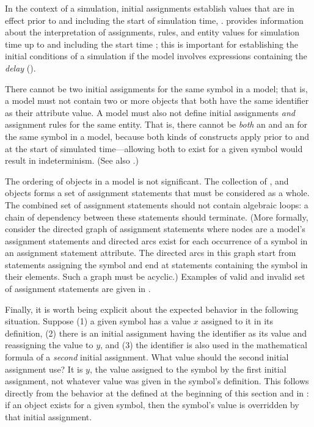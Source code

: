 In the context of a simulation, initial assignments establish
values that are in effect prior to and including the start of
simulation time, \ie {}.  
provides information about the interpretation of assignments,
rules, and entity values for simulation time up to and including
the start time ; this is important for establishing the
initial conditions of a simulation if the model involves
expressions containing the \emph{delay} 
().

There cannot be two initial assignments for the same symbol in a
model; that is, a model must not contain two or more
\InitialAssignment objects that both have the same identifier as
their  attribute value.  A model must also not define
initial assignments \emph{and} assignment rules for the same
entity.  That is, there cannot be \emph{both} an
\InitialAssignment and an \AssignmentRule for the same symbol in a
model, because both kinds of constructs apply prior to and at the
start of simulated time---allowing both to exist for a given
symbol would result in indeterminism.  (See also
.)

The ordering of \InitialAssignment objects in a model is not
significant.  The collection of \InitialAssignment,
\AssignmentRule and \KineticLaw objects forms a set of assignment
statements that must be considered as a whole.  The combined set
of assignment statements should not contain algebraic loops: a
chain of dependency between these statements should terminate.
(More formally, consider the directed graph of assignment
statements where nodes are a model's assignment statements and
directed arcs exist for each occurrence of a symbol in an
assignment statement  attribute.  The directed arcs in
this graph start from statements assigning the symbol and end at
statements containing the symbol in their  elements.
Such a graph must be acyclic.) Examples of valid and invalid set
of assignment statements are given in
.

Finally, it is worth being explicit about the expected behavior in
the following situation.  Suppose (1) a given symbol has a value
$x$ assigned to it in its definition, (2) there is an initial
assignment having the identifier as its  value and
reassigning the value to $y$, and (3) the identifier is
also used in the mathematical formula of a \emph{second} initial
assignment.  What value should the second initial assignment use?
It is $y$, the value assigned to the symbol by the first initial
assignment, not whatever value was given in the symbol's
definition.  This follows directly from the behavior at the
defined at the beginning of this section and in
: if an \InitialAssignment object
exists for a given symbol, then the symbol's value is overridden
by that initial assignment.


